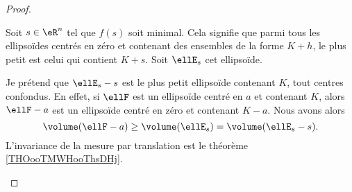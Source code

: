 \begin{proof}
\begin{subproof}
		Soit \( s\in \eR^n\) tel que \( f(s)\) soit minimal. Cela signifie que parmi tous les ellipsoïdes centrés en zéro et contenant des ensembles de la forme \( K+h\), le plus petit est celui qui contient \( K+s\). Soit \( \ellE_s\) cet ellipsoïde.

		Je prétend que \( \ellE_s-s\) est le plus petit ellipsoïde contenant \( K\), tout centres confondus. En effet, si \( \ellF\) est un ellipsoïde centré en \( a\) et contenant \( K\), alors \( \ellF-a\) est un ellipsoïde centré en zéro et contenant \( K-a\). Nous avons alors
		\begin{equation}
			\volume(\ellF-a)\geq \volume(\ellE_s)=\volume(\ellE_s-s).
		\end{equation}
		L'invariance de la mesure par translation est le théorème \ref{THOooTMWHooThsDHj}.
	\end{subproof}
\end{proof}

